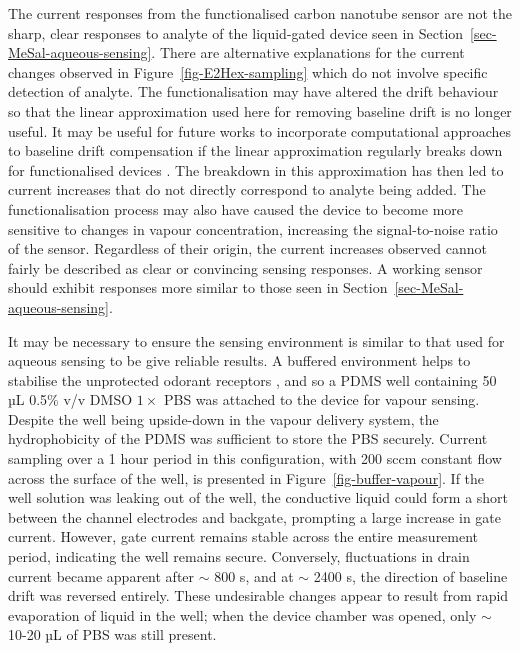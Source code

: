 \documentclass[
  a4paper,
]{scrbook}
\begin{document}
The current responses from the functionalised carbon nanotube sensor are
not the sharp, clear responses to analyte of the liquid-gated device
seen in Section~\ref{sec-MeSal-aqueous-sensing}. There are alternative
explanations for the current changes observed in
Figure~\ref{fig-E2Hex-sampling} which do not involve specific detection
of analyte. The functionalisation may have altered the drift behaviour
so that the linear approximation used here for removing baseline drift
is no longer useful. It may be useful for future works to incorporate
computational approaches to baseline drift compensation if the linear
approximation regularly breaks down for functionalised devices
\autocite{Zhang2022}. The breakdown in this approximation has then led
to current increases that do not directly correspond to analyte being
added. The functionalisation process may also have caused the device to
become more sensitive to changes in vapour concentration, increasing the
signal-to-noise ratio of the sensor. Regardless of their origin, the
current increases observed cannot fairly be described as clear or
convincing sensing responses. A working sensor should exhibit responses
more similar to those seen in Section~\ref{sec-MeSal-aqueous-sensing}.

It may be necessary to ensure the sensing environment is similar to that
used for aqueous sensing to be give reliable results. A buffered
environment helps to stabilise the unprotected odorant receptors
\autocite{Sato2014}, and so a PDMS well containing 50 µL 0.5\% v/v DMSO
\(1 \times\) PBS was attached to the device for vapour sensing. Despite
the well being upside-down in the vapour delivery system, the
hydrophobicity of the PDMS was sufficient to store the PBS securely.
Current sampling over a 1 hour period in this configuration, with 200
sccm constant flow across the surface of the well, is presented in
Figure~\ref{fig-buffer-vapour}. If the well solution was leaking out of
the well, the conductive liquid could form a short between the channel
electrodes and backgate, prompting a large increase in gate current.
However, gate current remains stable across the entire measurement
period, indicating the well remains secure. Conversely, fluctuations in
drain current became apparent after \(\sim\) 800 s, and at \(\sim\) 2400
s, the direction of baseline drift was reversed entirely. These
undesirable changes appear to result from rapid evaporation of liquid in
the well; when the device chamber was opened, only \(\sim\) 10-20 µL of
PBS was still present.
\end{document}
